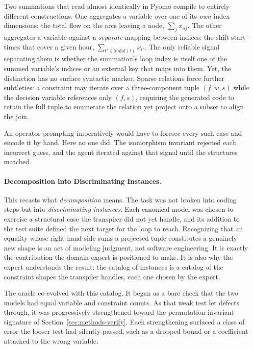 \documentclass[runningheads]{llncs}
\begin{document}
Two summations that read almost identically in Pyomo compile to entirely different constructions. One aggregates a variable over one of its \emph{own} index dimensions: the total flow on the arcs leaving a node, $\sum_{j} x_{nj}$. The other aggregates a variable against a \emph{separate} mapping between indices: the shift start-times that cover a given hour, $\sum_{t' \in \mathrm{Valid}(t)} x_{t'}$. The only reliable signal separating them is whether the summation's loop index is itself one of the summed variable's indices or an external key that maps into them. Yet, the distinction has no surface syntactic marker. Sparse relations force further subtleties: a constraint may iterate over a three-component tuple $(f,w,s)$ while the decision variable references only $(f,s)$, requiring the generated code to retain the full tuple to enumerate the relation yet project onto a subset to align the join. 

An operator prompting imperatively would have to foresee every such case and encode it by hand. Here no one did. The isomorphism invariant rejected each incorrect guess, and the agent iterated against that signal until the structures matched.

\paragraph{Decomposition into Discriminating Instances.} This recasts what \emph{decomposition} means. The task was not broken into coding steps but into \emph{discriminating instances}. Each canonical model was chosen to exercise a structural case the transpiler did not yet handle, and its addition to the test suite defined the next target for the loop to reach. Recognizing that an equality whose right-hand side sums a projected tuple constitutes a genuinely new shape is an act of modeling judgment, not software engineering. It is exactly the contribution the domain expert is positioned to make. It is also why the expert understands the result: the catalog of instances is a catalog of the constraint shapes the transpiler handles, each one chosen by the expert. 

The oracle co-evolved with this catalog. It began as a bare check that the two models had equal variable and constraint counts. As that weak test let defects through, it was progressively strengthened toward the permutation-invariant signature of Section~\ref{sec:methods-verify}. Each strengthening surfaced a class of error the looser test had silently passed, such as a dropped bound or a coefficient attached to the wrong variable.
\end{document}
